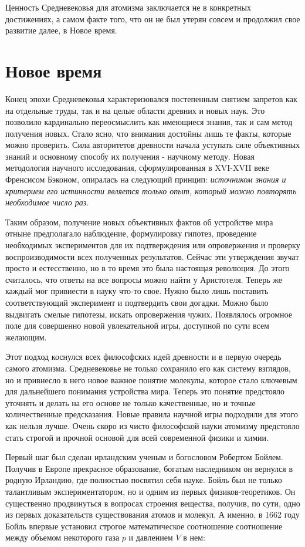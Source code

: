 Ценность Средневековья для атомизма заключается не в конкретных достижениях, а самом факте того, что он не был утерян совсем и продолжил свое развитие далее, в Новое время.


\section*{Новое время}

Конец эпохи Средневековья характеризовался постепенным снятием запретов как на отдельные труды, так и на целые области древних и новых наук. 
Это позволило кардинально переосмыслить как имеющиеся знания, так и сам метод получения новых.
Стало ясно, что внимания достойны лишь те факты, которые можно проверить.
Сила авторитетов древности начала уступать силе объективных знаний и основному способу их получения - научному методу.
Новая методология научного исследования, сформулированная в XVI-XVII веке Френсисом Бэконом, опиралась на следующий принцип: \textit{источником знания и критерием его истинности является только опыт, который можно повторять необходимое число раз}.

Таким образом, получение новых объективных фактов об устройстве мира отныне предполагало наблюдение, формулировку гипотез, проведение необходимых экспериментов для их подтверждения или опровержения и проверку воспроизводимости всех полученных результатов.
Сейчас эти утверждения звучат просто и естесственно, но в то время это была настоящая революция.
До этого считалось, что ответы на все вопросы можно найти у Аристотеля.
Теперь же каждый мог привнести в науку что-то свое.
Нужно было лишь поставить соответствующий эксперимент и подтвердить свои догадки.
Можно было выдвигать смелые гипотезы, искать опровержения чужих.
Появлялось огромное поле для совершенно новой увлекательной игры, доступной по сути всем желающим.

Этот подход коснулся всех философских идей древности и в первую очередь самого атомизма.
Средневековье не только сохранило его как систему взглядов, но и привнесло в него новое важное понятие молекулы, которое стало ключевым для дальнейшего понимания устройства мира. 
Теперь это понятие предстояло уточнять и делать на его основе не только качественные, но и точные количественные предсказания.
Новые правила научной игры подходили для этого как нельзя лучше.
Очень скоро из чисто философской науки атомизму предстояло стать строгой и прочной основой для всей современной физики и химии.

Первый шаг был сделан ирландским ученым и богословом Робертом Бойлем.
Получив в Европе прекрасное образование, богатым наследником он вернулся в родную Ирландию, где полностью посвятил себя науке.
Бойль был не только талантливым экспериментатором, но и одним из первых физиков-теоретиков.
Он существенно продвинуться в вопросах строения вещества, получив, по сути, одно из первых доказательств существования атомов и молекул.
А именно, в 1662 году Бойль впервые установил строгое математическое соотношение соотношение между объемом некоторого газа $p$ и давлением $V$ в нем:

